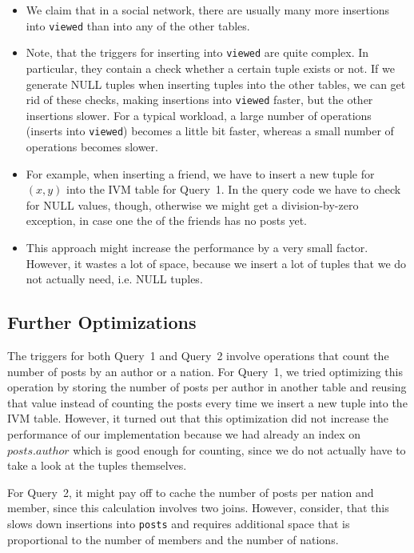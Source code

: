 \documentclass[12pt]{article}
\begin{document}
\begin{itemize}
	\item We claim that in a social network, there are usually many more insertions into \lstinline{viewed} than into any of the other tables.
    \item Note, that the triggers for inserting into \lstinline{viewed} are quite complex. In particular, they contain a check whether a certain tuple exists or not. If we generate NULL tuples when inserting tuples into the other tables, we can get rid of these checks, making insertions into \lstinline{viewed} faster, but the other insertions slower. For a typical workload, a large number of operations (inserts into \lstinline{viewed}) becomes a little bit faster, whereas a small number of operations becomes slower.
    \item For example, when inserting a friend, we have to insert a new tuple for $(x,y)$ into the IVM table for Query~1. In the query code we have to check for NULL values, though, otherwise we might get a division-by-zero exception, in case one the of the friends has no posts yet.
    \item This approach might increase the performance by a very small factor. However, it wastes a lot of space, because we insert a lot of tuples that we do not actually need, i.e. NULL tuples.
\end{itemize}

\subsection{Further Optimizations}
The triggers for both Query~1 and Query~2 involve operations that count the number of posts by an author or a nation. For Query~1, we tried optimizing this operation by storing the number of posts per author in another table and reusing that value instead of counting the posts every time we insert a new tuple into the IVM table. However, it turned out that this optimization did not increase the performance of our implementation because we had already an index on $\mathit{posts.author}$ which is good enough for counting, since we do not actually have to take a look at the tuples themselves.

For Query~2, it might pay off to cache the number of posts per nation and member, since this calculation involves two joins. However, consider, that this slows down insertions into \lstinline{posts} and requires additional space that is proportional to the number of members and the number of nations.
\end{document}
